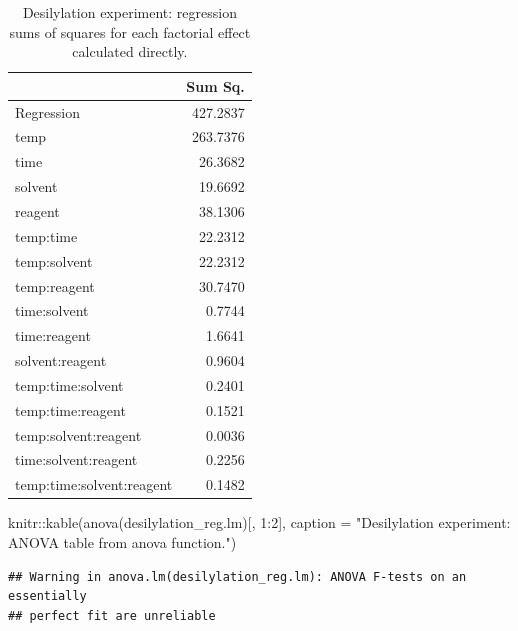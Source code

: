 \documentclass[
]{book}
\newenvironment{Shaded}{\begin{snugshade}}{\end{snugshade}}
\newcommand{\AttributeTok}[1]{\textcolor[rgb]{0.77,0.63,0.00}{#1}}
\newcommand{\DecValTok}[1]{\textcolor[rgb]{0.00,0.00,0.81}{#1}}
\newcommand{\FunctionTok}[1]{\textcolor[rgb]{0.00,0.00,0.00}{#1}}
\newcommand{\NormalTok}[1]{#1}
\newcommand{\SpecialCharTok}[1]{\textcolor[rgb]{0.00,0.00,0.00}{#1}}
\newcommand{\StringTok}[1]{\textcolor[rgb]{0.31,0.60,0.02}{#1}}
\theoremstyle{definition}
\theoremstyle{definition}
\theoremstyle{definition}
\theoremstyle{definition}
\theoremstyle{remark}
\begin{document}
\begin{table}

\caption{\label{tab:desilylation-regss}Desilylation experiment: regression sums of squares for each factorial effect calculated directly.}
\centering
\begin{tabular}[t]{l|r}
\hline
  & Sum Sq.\\
\hline
Regression & 427.2837\\
\hline
temp & 263.7376\\
\hline
time & 26.3682\\
\hline
solvent & 19.6692\\
\hline
reagent & 38.1306\\
\hline
temp:time & 22.2312\\
\hline
temp:solvent & 22.2312\\
\hline
temp:reagent & 30.7470\\
\hline
time:solvent & 0.7744\\
\hline
time:reagent & 1.6641\\
\hline
solvent:reagent & 0.9604\\
\hline
temp:time:solvent & 0.2401\\
\hline
temp:time:reagent & 0.1521\\
\hline
temp:solvent:reagent & 0.0036\\
\hline
time:solvent:reagent & 0.2256\\
\hline
temp:time:solvent:reagent & 0.1482\\
\hline
\end{tabular}
\end{table}

\begin{Shaded}
\begin{Highlighting}[]
\NormalTok{knitr}\SpecialCharTok{::}\FunctionTok{kable}\NormalTok{(}\FunctionTok{anova}\NormalTok{(desilylation\_reg.lm)[, }\DecValTok{1}\SpecialCharTok{:}\DecValTok{2}\NormalTok{], }\AttributeTok{caption =} \StringTok{"Desilylation experiment: ANOVA table from \textasciigrave{}anova\textasciigrave{} function."}\NormalTok{)}
\end{Highlighting}
\end{Shaded}

\begin{verbatim}
## Warning in anova.lm(desilylation_reg.lm): ANOVA F-tests on an essentially
## perfect fit are unreliable
\end{verbatim}
\end{document}
